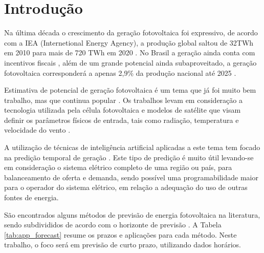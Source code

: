 \chapter{Introdução}
\label{cap:introducao}

Na última década o crescimento da geração fotovoltaica foi expressivo, de acordo com a IEA (Internetional Energy Agency), a produção global saltou de 32TWh em 2010 para mais de 720 TWh em 2020 \cite{ieasolarpvontrack2020}. No Brasil a geração ainda conta com incentivos fiscais \cite{da2016panorama}, além de um grande potencial ainda subaproveitado, a geração fotovoltaica corresponderá a apenas 2,9\% da produção nacional até 2025 \cite{ONSSIN}. 

Estimativa de potencial de geração fotovoltaica é um tema que já foi muito bem trabalho, mas que continua popular \cite{chin2015cell, jordehi2016parameter, de2017performance}. Os trabalhos levam em consideração a tecnologia utilizada pela célula fotovoltaica e modelos de satélite que visam definir os parâmetros físicos de entrada, tais como radiação, temperatura e velocidade do vento \cite{mueller2009cm, huld2012new, amillo2014new, habte2017evaluation}.

A utilização de técnicas de inteligência artificial aplicadas a este tema tem focado na predição temporal de geração \cite{voyant2017machine, wolff2016statistical, li2016hierarchical}. Este tipo de predição é muito útil levando-se em consideração o sistema elétrico completo de uma região ou país, para balanceamento de oferta e demanda, sendo possível uma programabilidade maior para o operador do sistema elétrico, em relação a adequação do uso de outras fontes de energia.

São encontrados alguns métodos de previsão de energia fotovoltaica na literatura, sendo subdivididos de acordo com o horizonte de previsão \cite{mellit2020advanced}. A Tabela \ref{tab:app_forecast} resume os prazos e aplicações para cada método. Neste trabalho, o foco será em previsão de curto prazo, utilizando dados horários.

